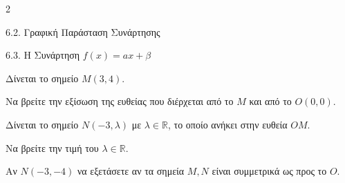 \begin{ylh}{2}
    \item 6.2. Γραφική Παράσταση Συνάρτησης
    \item 6.3. Η Συνάρτηση $f(x)=ax+\beta$
\end{ylh}
Δίνεται το σημείο $M(3, 4)$.
\begin{alist}
\item Να βρείτε την εξίσωση της ευθείας που διέρχεται από το $M$ και από το $O(0, 0)$.
\item Δίνεται το σημείο $N(-3, \lambda)$ με $\lambda \in \mathbb{R}$, το οποίο ανήκει στην ευθεία $OM$.
\begin{rlist}
\item Να βρείτε την τιμή του $\lambda \in \mathbb{R}$.
\item Αν $N(-3, -4)$ να εξετάσετε αν τα σημεία $M, N$ είναι συμμετρικά ως προς το $O$.
\end{rlist}
\end{alist}

